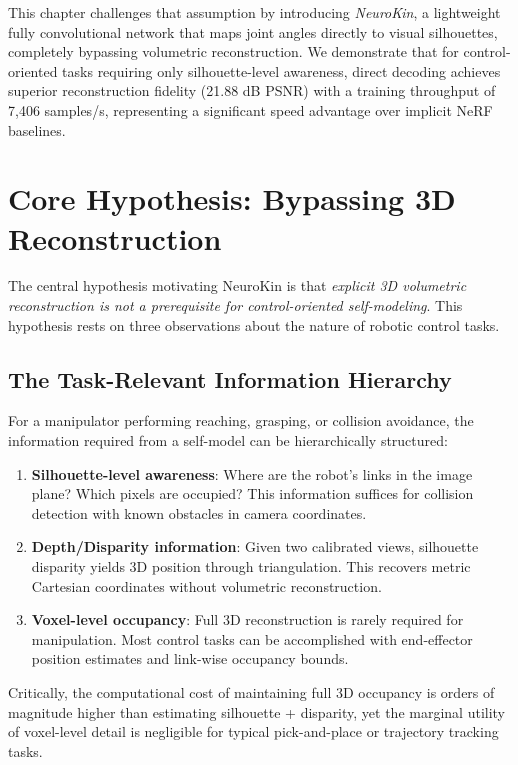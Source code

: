 \documentclass[12pt,a4paper,oneside]{report}
\begin{document}
This chapter challenges that assumption by introducing \textit{NeuroKin}, a lightweight fully convolutional network that maps joint angles directly to visual silhouettes, completely bypassing volumetric reconstruction. We demonstrate that for control-oriented tasks requiring only silhouette-level awareness, direct decoding achieves superior reconstruction fidelity (21.88 dB PSNR) with a training throughput of 7,406 samples/s, representing a significant speed advantage over implicit NeRF baselines.

\section{Core Hypothesis: Bypassing 3D Reconstruction}

The central hypothesis motivating NeuroKin is that \textit{explicit 3D volumetric reconstruction is not a prerequisite for control-oriented self-modeling}. This hypothesis rests on three observations about the nature of robotic control tasks.

\subsection{The Task-Relevant Information Hierarchy}

For a manipulator performing reaching, grasping, or collision avoidance, the information required from a self-model can be hierarchically structured:
\begin{enumerate}
    \item \textbf{Silhouette-level awareness}: Where are the robot's links in the image plane? Which pixels are occupied? This information suffices for collision detection with known obstacles in camera coordinates.
    \item \textbf{Depth/Disparity information}: Given two calibrated views, silhouette disparity yields 3D position through triangulation. This recovers metric Cartesian coordinates without volumetric reconstruction.
    \item \textbf{Voxel-level occupancy}: Full 3D reconstruction is rarely required for manipulation. Most control tasks can be accomplished with end-effector position estimates and link-wise occupancy bounds.
\end{enumerate}

Critically, the computational cost of maintaining full 3D occupancy is orders of magnitude higher than estimating silhouette + disparity, yet the marginal utility of voxel-level detail is negligible for typical pick-and-place or trajectory tracking tasks.
\end{document}
